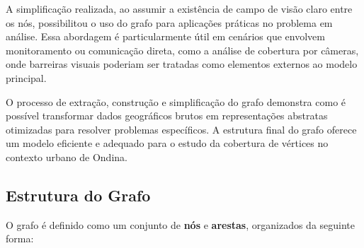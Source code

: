 \documentclass[12pt, a4paper]{report}
\begin{document}
A simplificação realizada, ao assumir a existência de campo de visão claro entre os nós, possibilitou o uso do grafo para aplicações práticas no problema em análise. Essa abordagem é particularmente útil em cenários que envolvem monitoramento ou comunicação direta, como a análise de cobertura por câmeras, onde barreiras visuais poderiam ser tratadas como elementos externos ao modelo principal.

O processo de extração, construção e simplificação do grafo demonstra como é possível transformar dados geográficos brutos em representações abstratas otimizadas para resolver problemas específicos. A estrutura final do grafo oferece um modelo eficiente e adequado para o estudo da cobertura de vértices no contexto urbano de Ondina.

\subsection{Estrutura do Grafo}

O grafo é definido como um conjunto de \textbf{nós} e \textbf{arestas}, organizados da seguinte forma:
\end{document}
